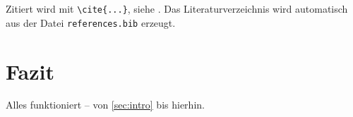 \documentclass[12pt,a4paper]{article}
\begin{document}
Zitiert wird mit \texttt{\textbackslash cite}\texttt{\{...\}}, siehe
\cite{lamport1994,kopka2003,mittelbach2004}. Das Literaturverzeichnis wird
automatisch aus der Datei \texttt{references.bib} erzeugt.

\section{Fazit}
\label{sec:fazit}
Alles funktioniert – von \cref{sec:intro} bis hierhin.


\newpage


\end{document}
